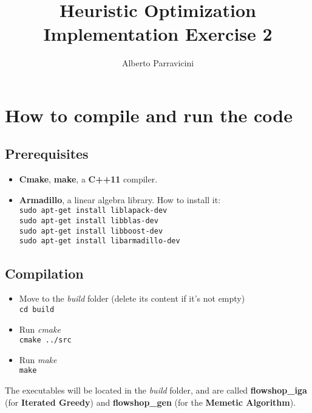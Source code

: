 \documentclass[
12pt,
a4paper,
oneside,
headinclude,
footinclude]{article}
\title{\textbf{Heuristic Optimization \\ Implementation Exercise 2}}
\author{{Alberto Parravicini}}
\date{}	%
\theoremstyle{definition} %
\begin{document}
\maketitle
{}
\setcounter{page}{1}






\section{How to compile and run the code}
\subsection{\textbf{Prerequisites}}
\begin{itemize}
    \item \textbf{Cmake}, \textbf{make}, a \textbf{C++11} compiler.
    \item \textbf{Armadillo}, a linear algebra library. How to install it:\\
        \-\quad\texttt{sudo apt-get install liblapack-dev}\\
        \-\quad\texttt{sudo apt-get install libblas-dev}\\
        \-\quad\texttt{sudo apt-get install libboost-dev}\\
        
        \quad\texttt{sudo apt-get install libarmadillo-dev}
\end{itemize}
\subsection{\textbf{Compilation}}
\begin{itemize}
   \item Move to the \textit{build} folder (delete its content if it's not empty)\\
    \-\quad\texttt{cd build}
   \item Run \textit{cmake}\\
    \-\quad\texttt{cmake ../src}
   \item Run \textit{make}\\
    \-\quad\texttt{make}
\end{itemize}

The executables will be located in the \textit{build} folder, and are called \textbf{flowshop\_iga} (for \textbf{Iterated Greedy}) and \textbf{flowshop\_gen} (for the \textbf{Memetic Algorithm}).
\end{document}
